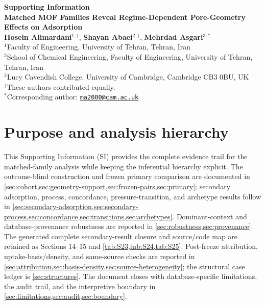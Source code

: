 \documentclass[11pt,a4paper]{article}
\newcommand{\papertitle}{Matched MOF Families Reveal Regime-Dependent Pore-Geometry Effects on Adsorption}
\begin{document}
\begin{center}
{\LARGE \textbf{Supporting Information}}\\[0.5em]
{\Large \textbf{\papertitle}}\\[1.2em]

{\large \textbf{Hosein Alimardani}$^{1,\dagger}$, \textbf{Shayan Abaei}$^{2,\dagger}$,
\textbf{Mehrdad Asgari}$^{3,*}$}\\[0.9em]

{\normalsize $^{1}$Faculty of Engineering, University of Tehran, Tehran, Iran}\\[0.35em]
{\normalsize $^{2}$School of Chemical Engineering, Faculty of Engineering, University of Tehran, Tehran, Iran}\\[0.35em]
{\normalsize $^{3}$Lucy Cavendish College, University of Cambridge, Cambridge CB3 0BU, UK}\\[0.8em]

{\normalsize $^{\dagger}$These authors contributed equally.}\\[0.35em]
{\normalsize $^{*}$Corresponding author:
\href{mailto:ma2000@cam.ac.uk}{\texttt{ma2000@cam.ac.uk}}}
\end{center}

\vspace{1em}
\tableofcontents
\clearpage

\section{Purpose and analysis hierarchy}
\label{sec:purpose}

This Supporting Information (SI) provides the complete evidence trail for the
matched-family analysis while keeping the inferential hierarchy explicit. The
outcome-blind construction and frozen primary comparison are documented in
\cref{sec:cohort,sec:geometry-support,sec:frozen-pairs,sec:primary};
secondary adsorption, process, concordance, pressure-transition, and archetype
results follow in
\cref{sec:secondary-adsorption,sec:secondary-process,sec:concordance,sec:transitions,sec:archetypes}. Dominant-context and database-provenance robustness
are reported in \cref{sec:robustness,sec:provenance}. The generated complete
secondary-result closure and source/code map are retained as Sections 14--15 and
\cref{tab:S23,tab:S24,tab:S25}. Post-freeze attribution, uptake-basis/density, and
same-source checks are reported in
\cref{sec:attribution,sec:basis-density,sec:source-heterogeneity}; the structural
case ledger is \cref{sec:structures}. The document closes with database-specific
limitations, the audit trail, and the interpretive boundary in
\cref{sec:limitations,sec:audit,sec:boundary}.
\end{document}
